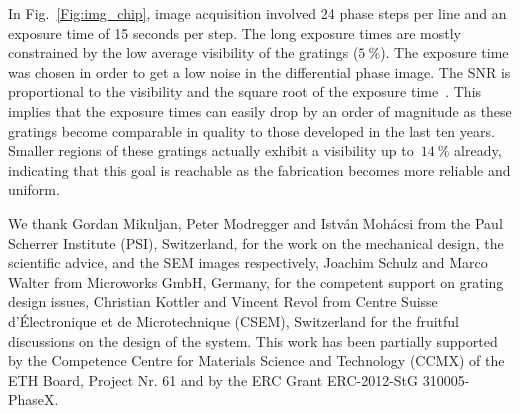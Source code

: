 \documentclass{pnastwo}
\begin{document}
\begin{article}
\begin{materials}
In Fig.~\ref{Fig:img_chip}, image acquisition involved 24 phase steps per
line and an exposure time of 15 seconds per step. The long
exposure times are mostly constrained by the low average visibility of the
gratings ($\scriptscriptstyle \SI{5}{\percent}$). The exposure time was chosen in order to
get a low noise in the differential phase image. The SNR is
proportional to the visibility and the square root of the exposure
time~\cite{Raupach2011}.
This implies that the exposure times can easily drop by an order of
magnitude as these gratings become comparable in quality to those developed
in the last ten years. 
Smaller regions of these gratings actually exhibit a visibility up
to~$\scriptscriptstyle \SI{14}{\percent}$ already, indicating that this goal is reachable as the
fabrication becomes more reliable and uniform.
\end{materials}



\begin{acknowledgments}
We thank Gordan Mikuljan, Peter Modregger and István Mohácsi from the Paul
Scherrer Institute (PSI), Switzerland, for the
work on the mechanical design, the scientific advice, and the SEM images
respectively, Joachim Schulz and Marco Walter from
Microworks GmbH, Germany, for the competent support on grating design
issues, Christian Kottler and Vincent Revol from Centre Suisse
d'\'Electronique et de Microtechnique (CSEM), Switzerland for the fruitful
discussions on the design of the system. This work has been partially
supported by the Competence Centre for Materials Science and Technology
(CCMX) of the ETH Board, Project Nr. 61 and by the ERC Grant ERC-2012-StG 310005-PhaseX.
\end{acknowledgments}




\end{article}
\end{document}

